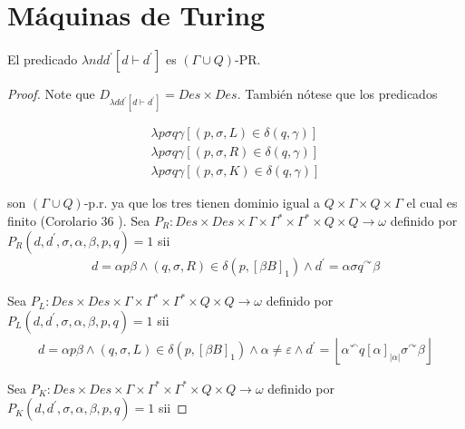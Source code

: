 \section{Máquinas de Turing}

  \begin{lemma}
  	El predicado $\lambda ndd^{\prime} \left[d\vdash d^{\prime}\right]$ es $(\Gamma \cup Q)$-PR.
	\begin{proof}
	  Note que $D_{\lambda dd^{\prime}\left[d\vdash d^{\prime }\right] }=Des\times Des$.
    También nótese que los predicados

    \begin{eqnarray}
      \nonumber \lambda p\sigma q\gamma \left[ (p,\sigma ,L)\in \delta (q,\gamma )\right] \\
      \nonumber \lambda p\sigma q\gamma \left[ (p,\sigma ,R)\in \delta (q,\gamma )\right] \\
      \nonumber \lambda p\sigma q\gamma \left[ (p,\sigma ,K)\in \delta (q,\gamma )\right]
    \end{eqnarray}

    son $(\Gamma \cup Q)$-p.r. ya que los tres tienen dominio igual a $Q\times \Gamma \times Q\times \Gamma $ el cual es
    finito (Corolario 36 ). Sea $P_{R}:Des\times Des\times \Gamma \times \Gamma ^{\ast }\times \Gamma ^{\ast }\times
    Q\times Q\rightarrow \omega $
    definido por $P_{R}(d,d^{\prime },\sigma ,\alpha ,\beta ,p,q)=1$ sii
    \begin{eqnarray}
      \nonumber d=\alpha p\beta \wedge (q,\sigma ,R)\in \delta \left( p,\left[ \beta B\right] _{1}\right) \wedge
                d^{\prime }=\alpha \sigma q^{\curvearrowright }\beta
    \end{eqnarray}

    Sea $P_{L}:Des\times Des\times \Gamma \times \Gamma ^{\ast }\times \Gamma ^{\ast }\times Q\times Q\rightarrow \omega
    $ definido por $P_{L}(d,d^{\prime },\sigma ,\alpha ,\beta ,p,q)=1$ sii
    \begin{eqnarray}
      \nonumber d=\alpha p\beta \wedge (q,\sigma ,L)\in \delta \left( p,\left[ \beta B\right] _{1}\right) \wedge \alpha
                \neq \varepsilon \wedge d^{\prime }=\left\lfloor \alpha ^{\curvearrowleft }q\left[ \alpha \right]
                _{\left\vert \alpha \right\vert }\sigma ^{\curvearrowright }\beta \right\rfloor
    \end{eqnarray}

    Sea $P_{K}:Des\times Des\times \Gamma \times \Gamma ^{\ast }\times \Gamma ^{\ast }\times Q\times Q\rightarrow \omega
    $ definido por $P_{K}(d,d^{\prime },\sigma ,\alpha ,\beta ,p,q)=1$ sii


\end{proof}
\end{lemma}
